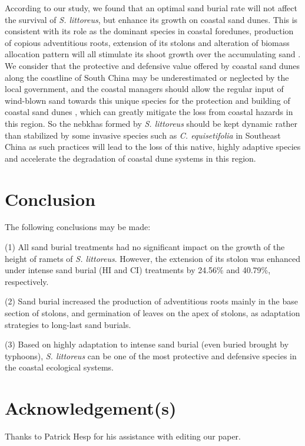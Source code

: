 \documentclass[]{interact}
\theoremstyle{plain}%
\theoremstyle{definition}
\theoremstyle{remark}
\begin{document}
According to our study, we found that an optimal sand burial rate will not affect the survival of \textit{S. littoreus}, but enhance its growth on coastal sand dunes. This is consistent with its role as the dominant species in coastal foredunes, production of copious adventitious roots, extension of its stolons and alteration of biomass allocation pattern will all stimulate its shoot growth over the accumulating sand \citep{dechAdventitiousRootProduction2006}. 
We consider that the protective and defensive value offered by coastal sand dunes along the coastline of South China may be underestimated or neglected by the local government, and the coastal managers should allow the regular input of wind-blown sand towards this unique species for the protection and building of coastal sand dunes \citep{noletUAVimagingModelGrowth2018}, which can greatly mitigate the loss from coastal hazards in this region. So the nebkhas formed by \textit{S. littoreus} should be kept dynamic rather than stabilized by some invasive species such as \textit{C. equisetifolia} in Southeast China as such practices will lead to the loss of this native, highly adaptive species and accelerate the degradation of coastal dune systems in this region. 

\section{Conclusion}
The following conclusions may be made:

(1) All sand burial treatments had no significant impact on the growth of the height of ramets of \textit{S. littoreus}. However, the extension of its stolon was enhanced under intense sand burial (HI and CI) treatments by 24.56\% and 40.79\%, respectively.

(2) Sand burial increased the production of adventitious roots mainly in the base section of stolons, and germination of leaves on the apex of stolons, as adaptation strategies to long-last sand burials. 

(3) Based on highly adaptation to intense sand burial (even buried brought by typhoons), \textit{S. littoreus} can be one of the most protective and defensive species in the coastal ecological systems.

\section*{Acknowledgement(s)}

Thanks to Patrick Hesp for his assistance with editing our paper.
\end{document}
